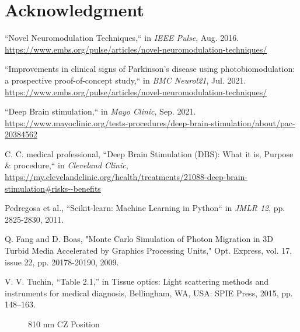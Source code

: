 \documentclass[journal,twoside,web]{ieeecolor}
\begin{document}
\section*{Acknowledgment}

\begin{thebibliography}{00}

 ``Novel Neuromodulation Techniques,`` in \emph{IEEE Pulse}, Aug. 2016. 
\url{https://www.embs.org/pulse/articles/novel-neuromodulation-techniques/} 

 ``Improvements in clinical signs of Parkinson's disease using photobiomodulation: a prospective proof-of-concept study,`` in \emph{BMC Neurol21}, Jul. 2021. 
\url{https://www.embs.org/pulse/articles/novel-neuromodulation-techniques/} 

 ``Deep Brain stimulation,`` in \emph{Mayo Clinic}, Sep. 2021. 
\url{https://www.mayoclinic.org/tests-procedures/deep-brain-stimulation/about/pac-20384562}

 C. C. medical professional, ``Deep Brain Stimulation (DBS): What it is, Purpose \& procedure,`` in \emph{Cleveland Clinic}, 
\url{https://my.clevelandclinic.org/health/treatments/21088-deep-brain-stimulation\#risks--benefits}

 Pedregosa et al., ``Scikit-learn: Machine Learning in Python`` in \emph{JMLR 12}, pp. 2825-2830, 2011.

 Q. Fang and D. Boas, "Monte Carlo Simulation of Photon Migration in 3D Turbid Media Accelerated by Graphics Processing Units," Opt. Express, vol. 17, issue 22, pp. 20178-20190, 2009.

 V. V. Tuchin, “Table 2.1,” in Tissue optics: Light scattering methods and instruments for 	medical diagnosis, Bellingham, WA, USA: SPIE Press, 2015, pp. 148–163. 
\end{thebibliography}

\begin{figure}[!htb]
    \caption{\label{fig:810-CZ} 810 nm CZ Position}
\end{figure}
\end{document}
